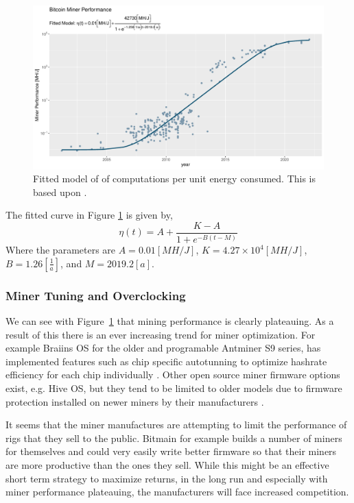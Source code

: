 \documentclass[runningheads]{llncs}
\begin{document}
\begin{figure}
    \includegraphics[width=\textwidth]{BTC Mining Performance.pdf}
    \caption{Fitted model of of computations per unit energy consumed. This is based upon \cite{rupp2020trends}.} \label{fig:3}
\end{figure}

The fitted curve in Figure \ref{fig:3} is given by,
\begin{equation}
    \eta(t) = A + \frac{K - A}{1 + e^{-B(t - M)}}
\end{equation}
Where the parameters are $A = 0.01 [MH/J]$, $K = 4.27\times 10^4 [MH/J]$,  $B = 1.26 [\frac{1}{a}]$, and $ M = 2019.2 [a]$.


\subsubsection{Miner Tuning and Overclocking}
We can see with Figure~\ref{fig:3} that mining performance is clearly plateauing.
As a result of this there is an ever increasing trend for miner optimization.
For example Braiins OS for the older and programable Antminer S9 series, has implemented features such as chip specific autotunning to optimize hashrate efficiency for each chip individually \cite{braiins2021autotuning}.
Other open source miner firmware options exist, e.g. Hive OS, but they tend to be limited to older models due to firmware protection installed on newer miners by their manufacturers \cite{hiveos2020update}.

It seems that the miner manufactures are attempting to limit the performance of rigs that they sell to the public.
Bitmain for example builds a number of miners for themselves and could very easily write better firmware so that their miners are more productive than the ones they sell.
While this might be an effective short term strategy to maximize returns, in the long run and especially with miner performance plateauing, the manufacturers will face increased competition.
\end{document}

